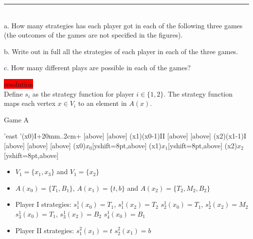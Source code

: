 \documentclass[10pt]{report}
\newenvironment{exercise}[1]
    {\vspace{0.5cm}\hrule\vspace{0.5cm}\noindent\fbox{#1}\\}
    {\vspace{0.5cm}}
\newenvironment{response}
{\vspace{0.2cm}\noindent\colorbox{red}{resolution}}
    {\vspace{0.5cm}}
\begin{document}
\begin{exercise}{3.5}
	a. How many strategies has each player got in each of the following three games (the outcomes of the games are not specified in the figures).

	b. Write out in full all the strategies of each player in each of the three games.

	c. How many different plays are possible in each of the games?

	\begin{response}\\
		Define $s_{i}$ as the strategy function for player $ i \in \{1,2\} $. The strategy function  maps each vertex $ x \in V_{i} $ to an element in $A(x)$.

		\vspace{0.5cm}
		Game A\\
		\vspace{0.5cm}
		\begin{istgame}[sloped,font=\tiny]
			\setistgrowdirection'{east}
			\setistOvalNodeStyle{.6cm}
			\istrooto'(x0){I}+{20mm}..{2cm}+
			[above]
			[above]
			\endist
			\xtShowEndPoints[oval node, minimum size=6pt]
			\xtdistance{20mm}{10mm}
			\istrooto(x1)(x0-1){II}
			[above]
			[above]
			\endist
			\istrooto(x2)(x1-1){I}
			[above]
			[above]
			[above]
			\endist
			\xtOwner(x0){$x_{0}$}[yshift=8pt,above]
			\xtOwner(x1){$x_{1}$}[yshift=8pt,above]
			\xtOwner(x2){$x_{2}$}[yshift=8pt,above]
		\end{istgame}

		\begin{itemize}
			\item $ V_{1} = \{x_{1}, x_{3}\} $ and $ V_{1} = \{x_{2}\} $
			\item $ A(x_{0}) = \{T_{1}, B_{1}\} $, $  A(x_{1}) = \{t, b\} $ and $A(x_{2}) = \{T_{2},M_{2}, B_{2}\}$
			\item Player I strategies:
			      \subitem $s_{1}^{1}(x_{0}) = T_{1}$, $s_{1}^{1}(x_{2}) = T_{2}$
			      \subitem $s_{2}^{1}(x_{0}) = T_{1}$, $s_{2}^{1}(x_{2}) = M_{2}$
			      \subitem $s_{3}^{1}(x_{0}) = T_{1}$, $s_{3}^{1}(x_{2}) = B_{2}$
			      \subitem $s_{4}^{1}(x_{0}) = B_{1}$
			\item Player II strategies:
			      \subitem $s_{1}^{2}(x_{1}) = t$
			      \subitem $s_{2}^{2}(x_{1}) = b$
		\end{itemize}


\end{response}
\end{exercise}
\end{document}
